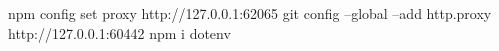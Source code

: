 npm config set proxy http://127.0.0.1:62065
git config --global --add http.proxy http://127.0.0.1:60442
npm i dotenv 
